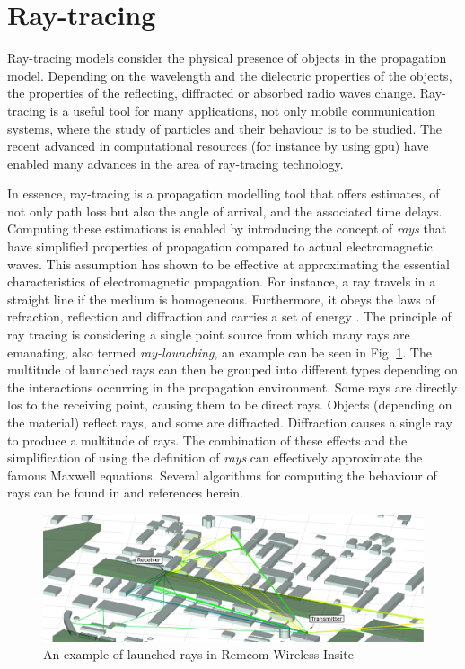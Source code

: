 \section{Ray-tracing}\label{sec:ray-tracing}

Ray-tracing models consider the physical presence of objects in the propagation model. Depending on the wavelength and the dielectric properties of the objects, the properties of the reflecting, diffracted or absorbed radio waves change. Ray-tracing is a useful tool for many applications, not only mobile communication systems, where the study of particles and their behaviour is to be studied. The recent advanced in computational resources (for instance by using \gls{gpu}) have enabled many advances in the area of ray-tracing technology.

In essence, ray-tracing is a propagation modelling tool that offers estimates, of not only path loss but also the angle of arrival, and the associated time delays. Computing these estimations is enabled by introducing the concept of \emph{rays} that have simplified properties of propagation compared to actual electromagnetic waves. This assumption has shown to be effective at approximating the essential characteristics of electromagnetic propagation. For instance, a ray travels in a straight line if the medium is homogeneous. Furthermore, it obeys the laws of refraction, reflection and diffraction and carries a set of energy \cite{Yun2015}. 
The principle of ray tracing is considering a single point source from which many rays are emanating, also termed \emph{ray-launching}, an example can be seen in Fig. \ref{fig:raytracing_launching}. The multitude of launched rays can then be grouped into different types depending on the interactions occurring in the propagation environment. Some rays are directly \acrlong{los} to the receiving point, causing them to be direct rays. Objects (depending on the material) reflect rays, and some are diffracted. Diffraction causes a single ray to produce a multitude of rays. The combination of these effects and the simplification of using the definition of \emph{rays} can effectively approximate the famous Maxwell equations.  Several algorithms for computing the behaviour of rays can be found in \cite{Yun2015} and references herein.


\begin{figure}
    \centering
    \includegraphics{chapters/part_pathloss/figures/RemcomRayLaunchingv2.png}
    \caption{An example of launched rays in Remcom Wireless Insite}
    \label{fig:raytracing_launching}
\end{figure}

